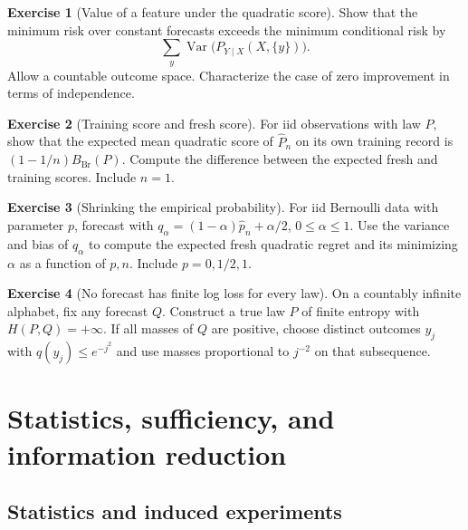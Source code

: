 \documentclass[11pt,oneside]{book}
\theoremstyle{definition}
\newtheorem{exercise}{Exercise}[section]
\theoremstyle{remark}
\begin{document}
\begin{exercise}[Value of a feature under the quadratic score]
\label{exer:quadratic-score-feature-value}
Show that the minimum risk over constant forecasts exceeds the
minimum conditional risk by
\[
\sum_y \operatorname{Var}\!\bigl(P_{Y\mid X}(X,\{y\})\bigr).
\]
Allow a countable outcome space. Characterize the case of zero
improvement in terms of independence.
\end{exercise}

\begin{exercise}[Training score and fresh score]
\label{exer:quadratic-score-training-fresh-gap}
For iid observations with law $P$, show that the expected mean
quadratic score of $\widehat P_n$ on its own training record is
$(1-1/n)B_{\mathrm{Br}}(P)$. Compute the difference between the
expected fresh and training scores. Include $n=1$.
\end{exercise}

\begin{exercise}[Shrinking the empirical probability]
\label{exer:quadratic-score-optimal-shrinkage}
For iid Bernoulli data with parameter $p$, forecast with
$q_\alpha=(1-\alpha)\widehat p_n+\alpha/2$,
$0\leq\alpha\leq1$. Use the variance and bias of $q_\alpha$
to compute the expected fresh quadratic regret and its
minimizing $\alpha$ as a function of $p,n$. Include $p=0,1/2,1$.
\end{exercise}

\begin{exercise}[No forecast has finite log loss for every law]
\label{exer:proper-score-no-universal-countable-forecast}
On a countably infinite alphabet, fix any forecast $Q$.
Construct a true law $P$ of finite entropy with $H(P,Q)=+\infty$.
If all masses of $Q$ are positive, choose distinct outcomes $y_j$
with $q(y_j)\leq e^{-j^2}$ and use masses proportional to $j^{-2}$
on that subsequence.
\end{exercise}



\chapter{Statistics, sufficiency, and information reduction}
\label{chap:statistics-sufficiency}
\section{Statistics and induced experiments}
\label{sec:statistics-induced-experiments}
\end{document}
